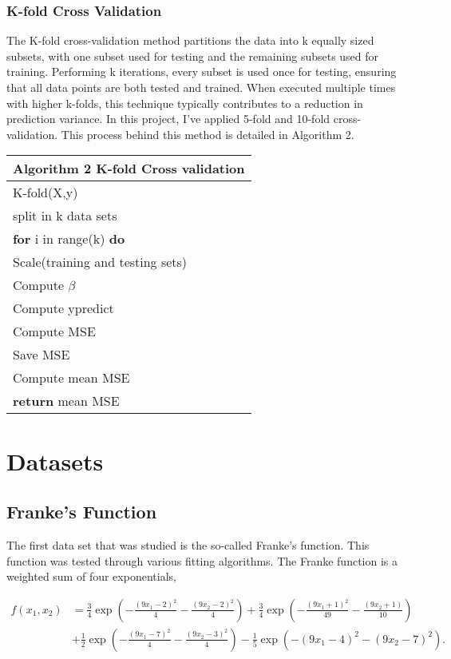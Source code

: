 \documentclass[a4paper,12pt]{article}
\begin{document}
\subsubsection{K-fold Cross Validation}
The K-fold cross-validation method partitions the data into k equally sized subsets, with one subset used for testing and the remaining subsets used for training. Performing k iterations, every subset is used once for testing, ensuring that all data points are both tested and trained. When executed multiple times with higher k-folds, this technique typically contributes to a reduction in prediction variance. In this project, I've applied 5-fold and 10-fold cross-validation. This process behind this method is detailed in Algorithm 2.

\begin{table}[!h]
\begin{tabular}{l} 
\hline
\textbf{Algorithm 2}  K-fold Cross validation\\ \hline 
K-fold(X,y)\\
\quad split in k data sets\\
\quad \textbf{for} i in range(k) \textbf{do}\\
\quad\quad Scale(training and testing sets)\\
\quad\quad Compute $\beta$\\
\quad\quad Compute ypredict  \\
\quad\quad Compute MSE \\
\quad\quad Save MSE\\
\quad Compute mean MSE\\
\quad \textbf{return} mean MSE
 \\ [1ex] 
\hline
\end{tabular}
\end{table}



\section{Datasets}
\subsection{Franke's Function}
The first data set that was studied is the so-called Franke's function. This function was tested through various fitting algorithms. The Franke function is a weighted sum of four exponentials,

\begin{equation} \label{eq1}
\begin{split}
f(x_1,x_2) &= \frac{3}{4}\exp{\left(-\frac{(9x_1-2)^2}{4} - \frac{(9x_2-2)^2}{4}\right)}+\frac{3}{4}\exp{\left(-\frac{(9x_1+1)^2}{49}- \frac{(9x_2+1)}{10}\right)} \\
&+\frac{1}{2}\exp{\left(-\frac{(9x_1-7)^2}{4} - \frac{(9x_2-3)^2}{4}\right)} -\frac{1}{5}\exp{\left(-(9x_1-4)^2 - (9x_2-7)^2\right) }.
\end{split}
\end{equation}
\end{document}
